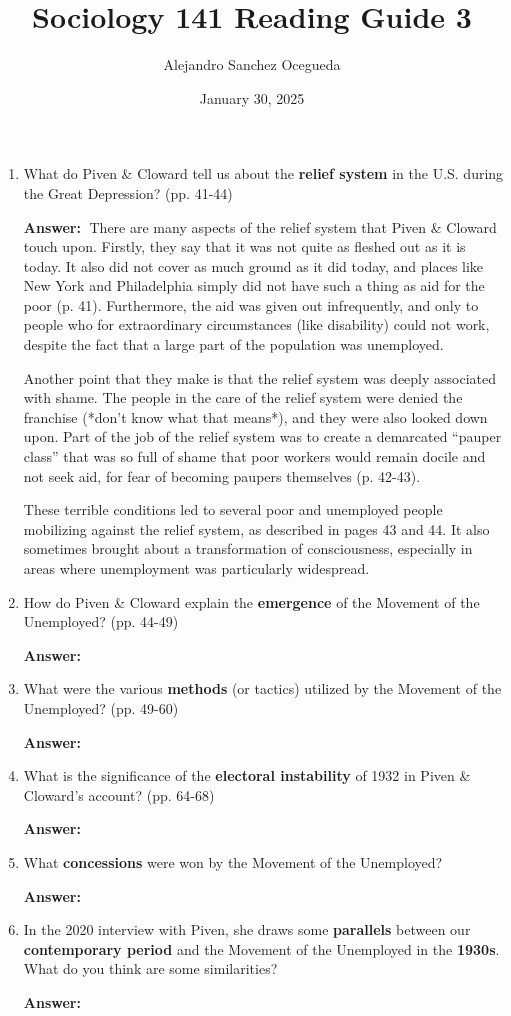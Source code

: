 \documentclass{article}
\title{Sociology 141 Reading Guide 3}
\author{Alejandro Sanchez Ocegueda}
\date{January 30, 2025}
\newcommand{\answer}{\textbf{Answer:}$\;$}
\begin{document}
\maketitle

\begin{enumerate}[label=\arabic*)]
    \item What do Piven \& Cloward tell us about the \textbf{relief system} in the U.S. during the Great Depression? (pp. 41-44)

    \answer 
    There are many aspects of the relief system that Piven \& Cloward touch upon.
    Firstly, they say that it was not quite as fleshed out as it is today.
    It also did not cover as much ground as it did today, and places like New York and Philadelphia simply did not have such a thing as aid for the poor (p. 41).
    Furthermore, the aid was given out infrequently, and only to people who for extraordinary circumstances (like disability) could not work, despite the fact that a large part of the population was unemployed.
    
    Another point that they make is that the relief system was deeply associated with shame.
    The people in the care of the relief system were denied the franchise (*don't know what that means*), and they were also looked down upon.
    Part of the job of the relief system was to create a demarcated ``pauper class'' that was so full of shame that poor workers would remain docile and not seek aid, for fear of becoming paupers themselves (p. 42-43).

    These terrible conditions led to several poor and unemployed people mobilizing against the relief system, as described in pages 43 and 44.
    It also sometimes brought about a transformation of consciousness, especially in areas where unemployment was particularly widespread.

    \item How do Piven \& Cloward explain the \textbf{emergence} of the Movement of the Unemployed? (pp. 44-49)

    \answer 

    \item What were the various \textbf{methods} (or tactics) utilized by the Movement of the Unemployed? (pp. 49-60)

    \answer

    \item What is the significance of the \textbf{electoral instability} of 1932 in Piven \& Cloward's account? (pp. 64-68)

    \answer

    \item What \textbf{concessions} were won by the Movement of the Unemployed?

    \answer

    \item In the 2020 interview with Piven, she draws some \textbf{parallels} between our \textbf{contemporary period} and the Movement of the Unemployed in the \textbf{1930s}.
    What do you think are some similarities?

    \answer
    
\end{enumerate}
 
\end{document}
